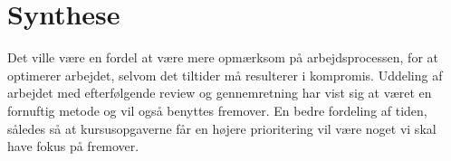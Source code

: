 \section{Synthese}
Det ville være en fordel at være mere opmærksom på arbejdsprocessen, for at optimerer arbejdet, selvom det tiltider må resulterer i kompromis. Uddeling af arbejdet med efterfølgende review og gennemretning har vist sig at været en fornuftig metode og vil også benyttes fremover. En bedre fordeling af tiden, således så at kursusopgaverne får en højere prioritering vil være noget vi skal have fokus på fremover.
